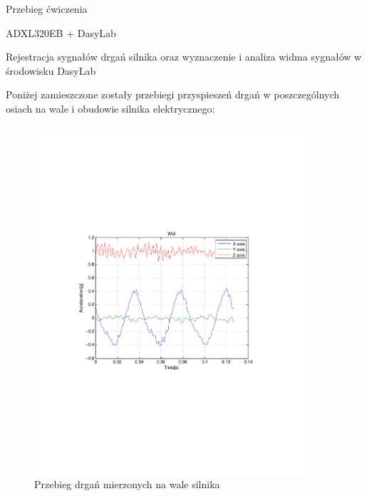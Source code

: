 \documentclass[12pt]{article}
\begin{document}
\begin{section}{Przebieg ćwiczenia}
\begin{subsection}{ADXL320EB + DasyLab}
	\end{subsection}
	
	\newpage
	
    
    \begin{subsection}{Rejestracja sygnałów drgań silnika oraz wyznaczenie i
    analiza widma sygnałów w środowisku DasyLab}
    
        Poniżej zamieszczone zostały przebiegi przyspieszeń drgań w
        poszczególnych osiach na wale i obudowie silnika elektrycznego: 
        
        \begin{figure}[!htb]
            \begin{center}
                \includegraphics[trim=5cm 8.5cm 5cm
                8.5cm,width=10cm]{../res/img/a_f(t)_wal.pdf}
            \end{center}
            \caption{Przebieg drgań mierzonych na wale silnika}
            \label{rys:pwal}
        \end{figure}
        \begin{figure}[!htb]
            \begin{center} 

\end{center}
\end{figure}
\end{subsection}
\end{section}
\end{document}
